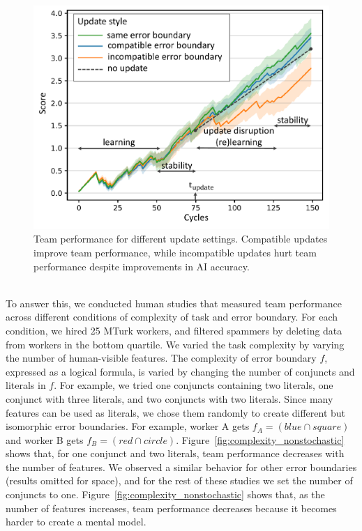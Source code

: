 \documentclass[letterpaper]{article} %
\newcommand{\?}{\mbox{?}}
\begin{document}
\begin{figure}[t]
  \centering
    \includegraphics[width=\columnwidth]{update_study.pdf}
    \caption{Team performance for different update settings. Compatible updates improve team performance, while incompatible updates hurt team performance  despite improvements in AI accuracy.}
    \label{fig:updateExp}
\end{figure}

\\
\noindent To answer this, we conducted human studies that measured team performance across different conditions of complexity of task and error boundary.
For each condition, we hired 25 MTurk workers, and filtered spammers by deleting data from workers in the bottom quartile.  
We varied the task complexity by varying the number of human-visible features. The complexity of error boundary $f$, expressed as a logical formula, is varied by changing the number of conjuncts and literals in $f$. For example, we tried one conjuncts containing two literals, one conjunct with three literals, and two conjuncts with two literals. 
Since many features can be used as literals,  we chose them randomly to create different but isomorphic error boundaries. For example, worker A gets $f_A = (blue \cap square)$ and worker B gets $f_B = (red \cap circle)$.
Figure~\ref{fig:complexity_nonstochastic} shows that, for one conjunct and two literals, team performance decreases with the number of features. We observed a similar behavior for other error boundaries (results omitted for space), and for the rest of these studies we set the number of conjuncts to one.
 Figure~\ref{fig:complexity_nonstochastic} shows that, as the number of features increases, team performance decreases because it becomes harder to create a mental model.
\end{document}
